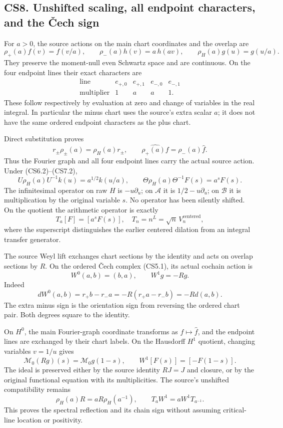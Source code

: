 \subsection{CS8. Unshifted scaling, all endpoint characters, and the
Čech
sign}\label{cs8.-unshifted-scaling-all-endpoint-characters-and-the-ux10dech-sign}

For \(a>0\), the source actions on the main chart coordinates and the
overlap are \[
\rho_+(a)f(v)=f(v/a),\qquad
\rho_-(a)h(v)=a\,h(av),\qquad
\rho_H(a)g(u)=g(u/a).
\tag{CS8.1}
\] They preserve the moment-null even Schwartz space and are continuous.
On the four endpoint lines their exact characters are \[
\begin{array}{c|cccc}
\text{line}&e_{+,0}&e_{+,1}&e_{-,0}&e_{-,1}\\ \hline
\text{multiplier}&1&a&a&1.
\end{array}
\tag{CS8.2}
\] These follow respectively by evaluation at zero and change of
variables in the real integral. In particular the minus chart uses the
source's extra scalar \(a\); it does not have the same ordered endpoint
characters as the plus chart.

Direct substitution proves \[
r_\pm\rho_\pm(a)=\rho_H(a)r_\pm,\qquad
\widehat{\rho_+(a)f}=\rho_-(a)\widehat f.
\tag{CS8.3}
\] Thus the Fourier graph and all four endpoint lines carry the actual
source action. Under (CS6.2)--(CS7.2), \[
U\rho_H(a)U^{-1}k(u)=a^{1/2}k(u/a),\qquad
\Theta\rho_H(a)\Theta^{-1}F(s)=a^sF(s).
\tag{CS8.4}
\] The infinitesimal operator on raw \(H\) is \(-u\partial_u\); on
\(\mathcal A\) it is \(1/2-u\partial_u\); on \(\mathcal B\) it is
multiplication by the original variable \(s\). No operator has been
silently shifted. On the quotient the arithmetic operator is exactly \[
T_a[F]=[a^sF(s)],
\quad
T_n=n^L=\sqrt n\,V_n^{\mathrm{centered}},
\tag{CS8.5}
\] where the superscript distinguishes the earlier centered dilation
from an integral transfer generator.

The source Weyl lift exchanges chart sections by the identity and acts
on overlap sections by \(R\). On the ordered Čech complex (CS5.1), its
actual cochain action is \[
W^0(a,b)=(b,a),\qquad W^1g=-Rg.
\tag{CS8.6}
\] Indeed \[
dW^0(a,b)=r_+b-r_-a
=-R(r_+a-r_-b)=-Rd(a,b).
\tag{CS8.7}
\] The extra minus sign is the orientation sign from reversing the
ordered chart pair. Both degrees square to the identity.

On \(H^0\), the main Fourier-graph coordinate transforms as
\(f\mapsto\widehat f\), and the endpoint lines are exchanged by their
chart labels. On the Hausdorff \(H^1\) quotient, changing variables
\(v=1/u\) gives \[
\mathcal M_0(Rg)(s)=\mathcal M_0g(1-s),\qquad
\boxed{W^1[F(s)]=[-F(1-s)].}
\tag{CS8.8}
\] The ideal is preserved either by the source identity \(RJ=J\) and
closure, or by the original functional equation with its multiplicities.
The source's unshifted compatibility remains \[
\rho_H(a)R=aR\rho_H(a^{-1}),
\qquad
T_aW^1=aW^1T_{a^{-1}}.
\tag{CS8.9}
\] This proves the spectral reflection and its chain sign without
assuming critical-line location or positivity.

